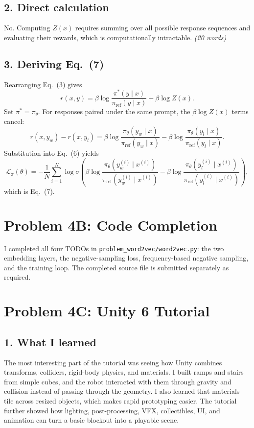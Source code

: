\documentclass[11pt]{article}
\begin{document}
\subsection*{2. Direct calculation}

No. Computing $Z(x)$ requires summing over all possible response sequences and
evaluating their rewards, which is computationally intractable. \emph{(20 words)}

\subsection*{3. Deriving Eq.~(7)}

Rearranging Eq.~(3) gives
\[
r(x,y)=\beta\log\frac{\pi^*(y\mid x)}
{\pi_{\mathrm{ref}}(y\mid x)}+\beta\log Z(x).
\]
Set $\pi^*=\pi_\theta$.  For responses paired under the same prompt, the
$\beta\log Z(x)$ terms cancel:
\[
r(x,y_w)-r(x,y_l)
=\beta\log\frac{\pi_\theta(y_w\mid x)}{\pi_{\mathrm{ref}}(y_w\mid x)}
-\beta\log\frac{\pi_\theta(y_l\mid x)}{\pi_{\mathrm{ref}}(y_l\mid x)}.
\]
Substitution into Eq.~(6) yields
\[
\mathcal L_\pi(\theta)=-\frac1N\sum_{i=1}^N\log\sigma\!\left(
\beta\log\frac{\pi_\theta(y_w^{(i)}\mid x^{(i)})}
{\pi_{\mathrm{ref}}(y_w^{(i)}\mid x^{(i)})}
-\beta\log\frac{\pi_\theta(y_l^{(i)}\mid x^{(i)})}
{\pi_{\mathrm{ref}}(y_l^{(i)}\mid x^{(i)})}
\right),
\]
which is Eq.~(7).

\newpage
\section*{Problem 4B: Code Completion}

I completed all four TODOs in \texttt{problem\_word2vec/word2vec.py}: the two
embedding layers, the negative-sampling loss, frequency-based negative
sampling, and the training loop.  The completed source file is submitted
separately as required.

\section*{Problem 4C: Unity 6 Tutorial}
\subsection*{1. What I learned}

The most interesting part of the tutorial was seeing how Unity combines
transforms, colliders, rigid-body physics, and materials.  I built ramps and
stairs from simple cubes, and the robot interacted with them through gravity
and collision instead of passing through the geometry.  I also learned that
materials tile across resized objects, which makes rapid prototyping easier.
The tutorial further showed how lighting, post-processing, VFX, collectibles,
UI, and animation can turn a basic blockout into a playable scene.
\end{document}
